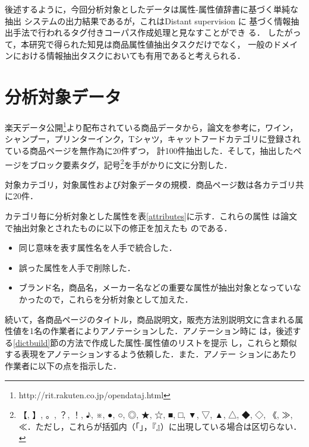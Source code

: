 \documentclass[japanese]{jnlp_1.4}
\begin{document}
後述するように，今回分析対象としたデータは属性-属性値辞書に基づく単純な抽出
システムの出力結果であるが，これはDistant supervision \cite{mintz2009}に
基づく情報抽出手法で行われるタグ付きコーパス作成処理と見なすことができ
る．
したがって，本研究で得られた知見は商品属性値抽出タスクだけでなく，
一般のドメインにおける情報抽出タスクにおいても有用であると考えられる．



\section{分析対象データ}
\label{corpus}

楽天データ公開\footnote{http://rit.rakuten.co.jp/opendataj.html}より配布されている商品データから，論文\cite{shinzato2013}を参考に，ワイン，シャンプー，プリンターインク，Tシャツ，キャットフードカテゴリに登録されている商品ページを無作為に20件ずつ，
計100件抽出した．そして，抽出したページをブロック要素タグ，記号\footnote{【, 】, 。, ？, ！, ♪, ※, ●, ○, ◎, ★, ☆, ■, □, ▼, ▽, ▲, △, ◆, ◇, 《, ≫, ≪．ただし，これらが括弧内（「」，『』）に出現している場合は区切らない．}を手がかりに文に分割した．

\begin{table}[b]
\caption{対象カテゴリ，対象属性および対象データの規模．商品ページ数は各カテゴリ共に20件．}
\label{attributes}

\end{table}

カテゴリ毎に分析対象とした属性を表\ref{attributes}に示す．これらの属性
は論文\cite{shinzato2013}で抽出対象とされたものに以下の修正を加えたも
のである．

\begin{itemize}
\item 同じ意味を表す属性名を人手で統合した．
\item 誤った属性を人手で削除した．
\item ブランド名，商品名，メーカー名などの重要な属性が抽出対象となっていなかったので，これらを分析対象として加えた．
\end{itemize}

続いて，各商品ページのタイトル，商品説明文，販売方法別説明文に含まれる属性値を1名の作業者によりアノテーションした．アノテーション時に
は，後述する\ref{dictbuild}節の方法で作成した属性-属性値のリストを提示
し，これらと類似する表現をアノテーションするよう依頼した．また．アノテー
ションにあたり作業者に以下の点を指示した．
\end{document}
